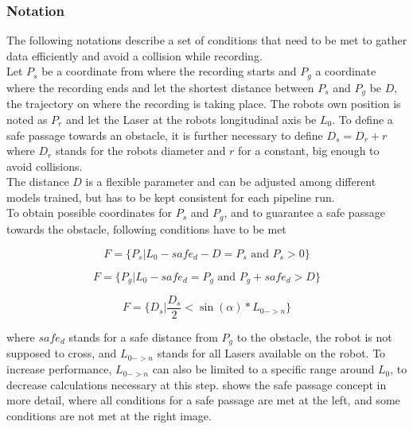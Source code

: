 \subsubsection{Notation \label{notation} }
The following notations describe a set of conditions that need to be met to gather data efficiently and avoid a collision while recording.\\

Let $ P_{s} $ be a coordinate from where the recording starts and $ P_{g} $ a
coordinate where the recording ends and let the shortest distance between $ P_{s} $ and $ P_{g} $ be $ D $, the trajectory on where the recording is taking place. The robots own position is noted as $ P_{r} $ and let the Laser at the robots longitudinal axis be $ L_{0} $. To define a safe passage towards an obstacle, it is further necessary to define $ D_{s} = D_{r} + r $ where $ D_{r} $ stands for the robots diameter and $ r $ for a constant, big enough to avoid collisions.\\

The distance $ D $ is a flexible parameter and can be adjusted among different models trained, but has to be kept consistent for each pipeline run.\\

To obtain possible coordinates for $ P_{s} $ and $P_{g}$, and to guarantee a safe passage towards the obstacle, following conditions have to be met

\begin{equation}
\label{eqn:1}
F = \{P_{s} |L_{0} - safe_{d} - D = P_{s} \mbox{~and~} P_{s} > 0\} 
\end{equation}

\begin{equation}
\label{eqn:2} 
F = \{P_{g} |L_{0} - safe_{d} = P_{g} \mbox{~and~} P_{g} + safe_{d} > D \}  
\end{equation}

\begin{equation}
\label{eqn:3} 
F = \{D_{s} |\frac{D_{s}}{2} < \sin(\alpha) * L_{0->n}\}  
\end{equation}

where $ safe_{d} $ stands for a safe distance
from $ P_{g} $ to the obstacle, the robot
is not supposed to cross, and $ L_{0->n} $ stands for all Lasers available on the robot. To increase performance, $ L_{0->n} $ can also be limited to a specific range around $ L_{0} $, to decrease calculations necessary at this step.  shows the safe passage concept in more detail, where all conditions for a safe passage are met at the left, and some conditions are not met at the right image.

